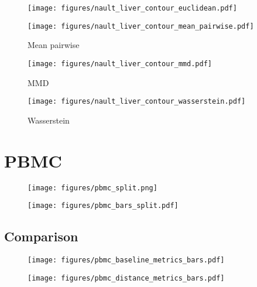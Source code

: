 \begin{figure}[h!]
    \centering
    \texttt{[image: figures/nault\_liver\_contour\_euclidean.pdf]}
\end{figure}

\clearpage

\begin{figure}[h!]
    \centering
    \texttt{[image: figures/nault\_liver\_contour\_mean\_pairwise.pdf]}
    \caption{Mean pairwise}
\end{figure}

\begin{figure}[h!]
    \centering
    \texttt{[image: figures/nault\_liver\_contour\_mmd.pdf]}
    \caption{MMD}
\end{figure}

\clearpage

\begin{figure}[h!]
    \centering
    \texttt{[image: figures/nault\_liver\_contour\_wasserstein.pdf]}
    \caption{Wasserstein}
\end{figure}

\clearpage

\section{PBMC}


\begin{figure}[h!]
    \centering
    \texttt{[image: figures/pbmc\_split.png]}
\end{figure}

\begin{figure}[h!]
    \centering
    \texttt{[image: figures/pbmc\_bars\_split.pdf]}
\end{figure}

\clearpage

\subsection{Comparison}

\begin{figure}[h!]
    \centering
    \texttt{[image: figures/pbmc\_baseline\_metrics\_bars.pdf]}
\end{figure}

\begin{figure}[h!]
    \centering
    \texttt{[image: figures/pbmc\_distance\_metrics\_bars.pdf]}
\end{figure}